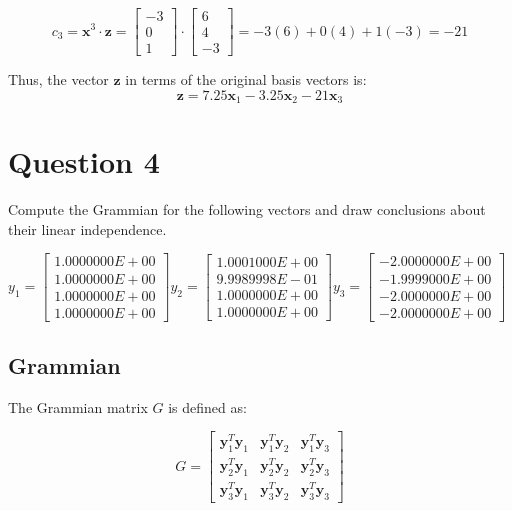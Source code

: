 \documentclass{article}
\begin{document}
\[
c_3 = \mathbf{x}^3 \cdot \mathbf{z} = \begin{bmatrix} -3 \\ 0 \\ 1 \end{bmatrix} \cdot \begin{bmatrix} 6 \\ 4 \\ -3 \end{bmatrix} = -3(6) + 0(4) + 1(-3) = -21
\]

Thus, the vector \( \mathbf{z} \) in terms of the original basis vectors is:
\[
\mathbf{z} = 7.25 \mathbf{x}_1 - 3.25 \mathbf{x}_2 - 21 \mathbf{x}_3
\]

\section{Question 4}

Compute the Grammian for the following vectors and draw conclusions about their linear independence. 

$y_1= \begin{bmatrix} 1.0000000E+00 \\ 1.0000000E+00 \\ 1.0000000E+00 \\ 1.0000000E+00 \end{bmatrix} y_2= \begin{bmatrix} 1.0001000E+00 \\ 9.9989998E-01 \\ 1.0000000E+00 \\ 1.0000000E+00 \end{bmatrix} y_3= \begin{bmatrix} -2.0000000E+00 \\ -1.9999000E+00 \\ -2.0000000E+00 \\ -2.0000000E+00 \end{bmatrix}$

\subsection{Grammian}

The Grammian matrix \( G \) is defined as:

\[
G = \begin{bmatrix} \mathbf{y}_1^T \mathbf{y}_1 & \mathbf{y}_1^T \mathbf{y}_2 & \mathbf{y}_1^T \mathbf{y}_3 \\
                    \mathbf{y}_2^T \mathbf{y}_1 & \mathbf{y}_2^T \mathbf{y}_2 & \mathbf{y}_2^T \mathbf{y}_3 \\
                    \mathbf{y}_3^T \mathbf{y}_1 & \mathbf{y}_3^T \mathbf{y}_2 & \mathbf{y}_3^T \mathbf{y}_3 \end{bmatrix}
\]
\end{document}
